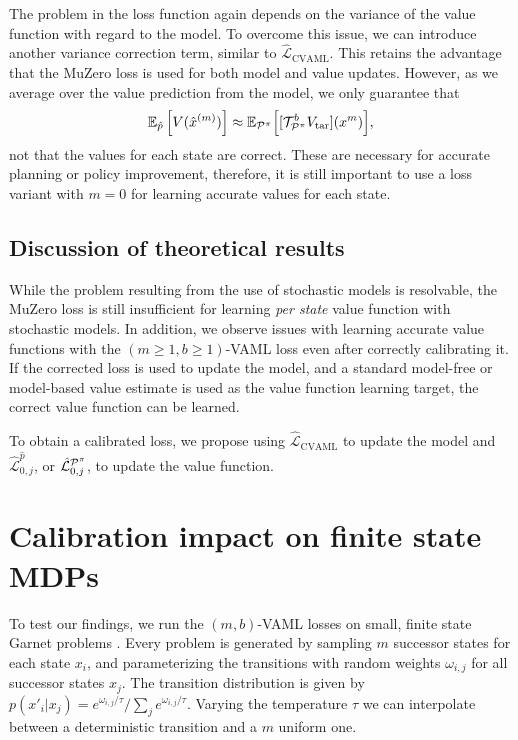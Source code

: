 The problem in the loss function again depends on the variance of the value function with regard to the model.
To overcome this issue, we can introduce another variance correction term, similar to $\hat{\mathcal{L}}_\mathrm{CVAML}$. 
This retains the advantage that the MuZero loss is used for both model and value updates.
However, as we average over the value prediction from the model, we only guarantee that 
\begin{align}
\mathbb{E}_{\hat{p}}\left[V(\hat{x}^{(m)})\right] \approx \mathbb{E}_{\P^\pi}\Bigl[[\mathcal{T}_{\P^\pi}^b V_\mathrm{tar}](x^{m})\Bigr],
\end{align}
not that the values for each state are correct.
These are necessary for accurate planning or policy improvement, therefore, it is still important to use a loss variant with $m=0$ for learning accurate values for each state.

\subsection{Discussion of theoretical results}
While the problem resulting from the use of stochastic models is resolvable, the MuZero loss is still insufficient for learning \emph{per state} value function with stochastic models.
In addition, we observe issues with learning accurate value functions with the $(m\geq1,b\geq1)$-VAML loss even after correctly calibrating it.
If the corrected loss is used to update the model, and a standard model-free or model-based value estimate is used as the value function learning target, the correct value function can be learned.

\begin{boxinsight}
    To obtain a calibrated loss, we propose using $\hat{\mathcal{L}}_\mathrm{CVAML}$ to update the model and $\hat{\mathcal{L}}^{\hat{p}}_{0,j}$, or $\hat{\mathcal{L}}^{\P^\pi}_{0,j}$, to update the value function.
\end{boxinsight}

\section{Calibration impact on finite state MDPs}
\label{sec:cvaml:empirical1}

To test our findings, we run the $(m,b)$-VAML losses on small, finite state Garnet problems \parencite{bhatnagar2007incremental}.
Every problem is generated by sampling $m$ successor states for each state $x_i$, and parameterizing the transitions with random weights $\omega_{i,j}$ for all successor states $x_j$.
The transition distribution is given by $p(x'_i|x_j) = {e^{\omega_{i,j}/\tau}}/{\sum_j e^{\omega_{i,j}/\tau}}$.
Varying the temperature $\tau$ we can interpolate between a deterministic transition and a $m$ uniform one.

